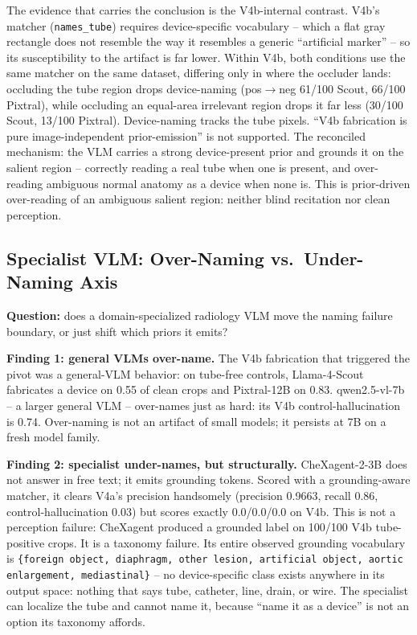 \documentclass{ieeeaccess}
\begin{document}
The evidence that carries the conclusion is the V4b-internal contrast. V4b's
matcher (\texttt{names\_tube}) requires device-specific vocabulary -- which a
flat gray rectangle does not resemble the way it resembles a generic
``artificial marker'' -- so its susceptibility to the artifact is far lower.
Within V4b, both conditions use the same matcher on the same dataset,
differing only in where the occluder lands: occluding the tube region drops
device-naming (pos$\to$neg 61/100 Scout, 66/100 Pixtral), while occluding an
equal-area irrelevant region drops it far less (30/100 Scout, 13/100
Pixtral). Device-naming tracks the tube pixels. ``V4b fabrication is pure
image-independent prior-emission'' is not supported. The reconciled
mechanism: the VLM carries a strong device-present prior and grounds it on
the salient region -- correctly reading a real tube when one is present, and
over-reading ambiguous normal anatomy as a device when none is. This is
prior-driven over-reading of an ambiguous salient region: neither blind
recitation nor clean perception.

\subsection{Specialist VLM: Over-Naming vs.\ Under-Naming Axis}
\label{sec:phase5-6.3}
\textbf{Question:} does a domain-specialized radiology VLM move the naming
failure boundary, or just shift which priors it emits?

\textbf{Finding 1: general VLMs over-name.} The V4b fabrication that
triggered the pivot was a general-VLM behavior: on tube-free controls,
Llama-4-Scout fabricates a device on 0.55 of clean crops and Pixtral-12B on
0.83. qwen2.5-vl-7b -- a larger general VLM -- over-names just as hard: its
V4b control-hallucination is 0.74. Over-naming is not an artifact of small
models; it persists at 7B on a fresh model family.

\textbf{Finding 2: specialist under-names, but structurally.} CheXagent-2-3B
does not answer in free text; it emits grounding tokens. Scored with a
grounding-aware matcher, it clears V4a's precision handsomely (precision
0.9663, recall 0.86, control-hallucination 0.03) but scores exactly
0.0/0.0/0.0 on V4b. This is not a perception failure: CheXagent produced a
grounded label on 100/100 V4b tube-positive crops. It is a taxonomy failure.
Its entire observed grounding vocabulary is \texttt{\{foreign object,
diaphragm, other lesion, artificial object, aortic enlargement,
mediastinal\}} -- no device-specific class exists anywhere in its output
space: nothing that says tube, catheter, line, drain, or wire. The
specialist can localize the tube and cannot name it, because ``name it as a
device'' is not an option its taxonomy affords.
\end{document}
